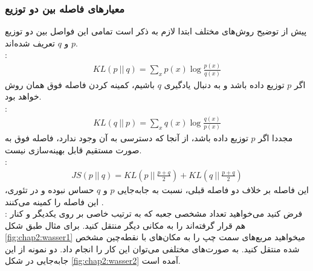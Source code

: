 \subsubsection{معیارهای فاصله بین دو توزیع} \label{chap2:divs}
پیش از توضیح روش‌های مختلف ابتدا  لازم به ذکر است تمامی این فواصل بین دو توزیع $p$ و $q$ تعریف شده‌اند.
\\
 \cite{bishop}:
\begin{gather} \label{eq: kl}
	KL (p ~ || ~ q)   = \sum_x p(x) \log \frac{p(x)}{q(x)}
\end{gather}
اگر $p$ توزیع داده باشد و به دنبال یادگیری $q$ باشیم، کمینه کردن فاصله فوق همان روش \maxlikelihood{} خواهد بود.
\\
:
\begin{gather} \label{eq: rkl}
	KL (q ~ || ~ p)   = \sum_x q(x) \log \frac{q(x)}{p(x)}
\end{gather}
مجددا اگر $p$ توزیع داده باشد، از آنجا که دسترسی به آن وجود ندارد، فاصله فوق به صورت مستقیم قابل بهینه‌سازی نیست.
\\
:
\begin{gather} \label{eq: js}
	JS (p ~ || ~ q)   = KL(p ~ || ~ \frac{p + q}{2}) + KL(q ~ || ~ \frac{p + q}{2})
\end{gather}
این فاصله بر خلاف دو فاصله قبلی، نسبت به جابه‌جایی $p$ و $q$ حساس نبوده و \gan{} در تئوری، این فاصله را کمینه می‌کنند \cite{gan}.
\\
:
فرض کنید می‌خواهید تعداد مشخصی جعبه که به ترتیب خاصی بر روی یکدیگر و کنار هم قرار گرفته‌اند را به مکانی دیگر منتقل کنید. برای مثال طبق شکل \ref{fig:chap2:wasser1} میخواهید مربع‌های سمت چپ را به مکان‌های با نقطه‌چین مشخص شده منتقل کنید. به صورت‌های مختلفی می‌توان این کار را انجام داد. دو نمونه از این جابه‌جایی در شکل \ref{fig:chap2:wasser2} آمده است.

